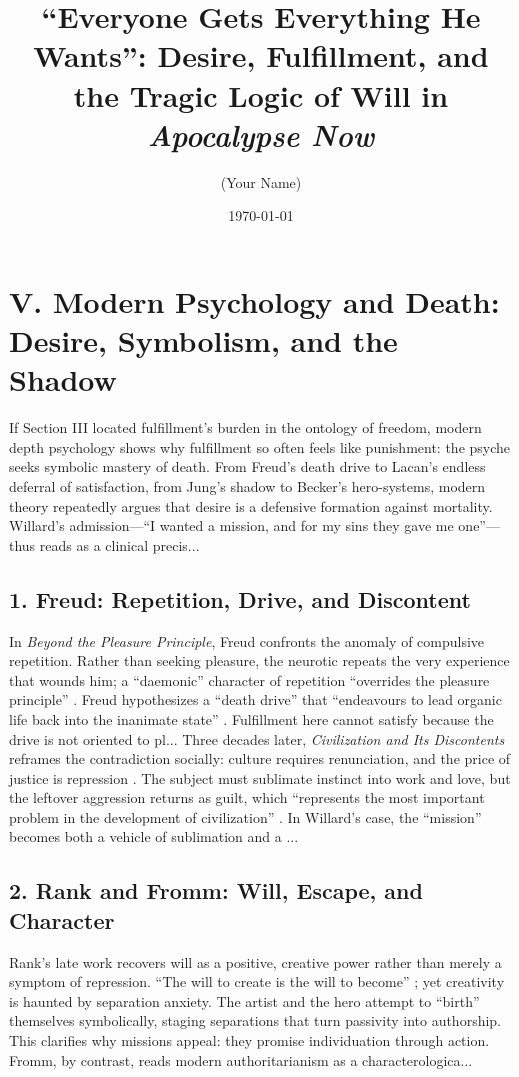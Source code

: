 \documentclass[12pt]{article}
\title{“Everyone Gets Everything He Wants”: Desire, Fulfillment, and the Tragic Logic of Will in \textit{Apocalypse Now}}
\author{(Your Name)}
\date{\today}
\begin{document}
\maketitle

\section*{V. Modern Psychology and Death: Desire, Symbolism, and the Shadow}

If Section III located fulfillment’s burden in the ontology of freedom, modern depth psychology shows why fulfillment so often feels like punishment: the psyche seeks symbolic mastery of death. From Freud’s death drive to Lacan’s endless deferral of satisfaction, from Jung’s shadow to Becker’s hero-systems, modern theory repeatedly argues that desire is a defensive formation against mortality. Willard’s admission---``I wanted a mission, and for my sins they gave me one''---thus reads as a clinical precis...
\subsection*{1. Freud: Repetition, Drive, and Discontent}
In \textit{Beyond the Pleasure Principle}, Freud confronts the anomaly of compulsive repetition. Rather than seeking pleasure, the neurotic repeats the very experience that wounds him; a ``daemonic'' character of repetition ``overrides the pleasure principle'' \parencite[p.~22]{FreudBeyond1955}. Freud hypothesizes a ``death drive'' that ``endeavours to lead organic life back into the inanimate state'' \parencite[p.~38]{FreudBeyond1955}. Fulfillment here cannot satisfy because the drive is not oriented to pl...
Three decades later, \textit{Civilization and Its Discontents} reframes the contradiction socially: culture requires renunciation, and the price of justice is repression \parencite{FreudCivilization1961}. The subject must sublimate instinct into work and love, but the leftover aggression returns as guilt, which ``represents the most important problem in the development of civilization'' \parencite[p.~97]{FreudCivilization1961}. In Willard’s case, the ``mission'' becomes both a vehicle of sublimation and a ...
\subsection*{2. Rank and Fromm: Will, Escape, and Character}
Rank’s late work recovers will as a positive, creative power rather than merely a symptom of repression. ``The will to create is the will to become'' \parencite[p.~xx]{RankWill1978}; yet creativity is haunted by separation anxiety. The artist and the hero attempt to ``birth'' themselves symbolically, staging separations that turn passivity into authorship. This clarifies why missions appeal: they promise individuation through action. Fromm, by contrast, reads modern authoritarianism as a characterologica...
\end{document}
